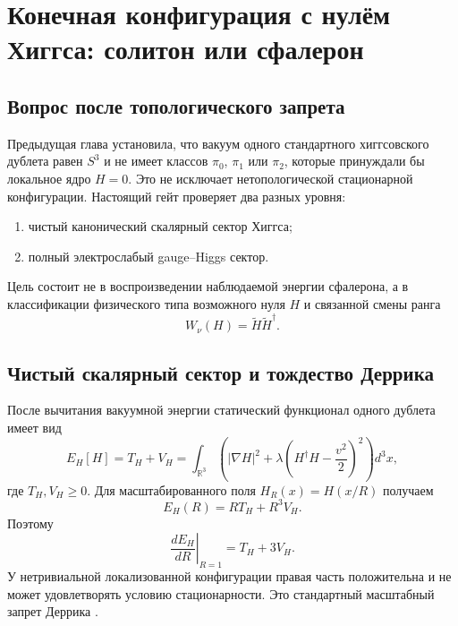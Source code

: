 \chapter{Конечная конфигурация с нулём Хиггса: солитон или сфалерон}
\label{ch:v6-spectral-transition-higgs-zero-finite-energy-saddle-gate}

\section{Вопрос после топологического запрета}

Предыдущая глава установила, что вакуум одного стандартного хиггсовского
дублета равен $S^3$ и не имеет классов $\pi_0$, $\pi_1$ или $\pi_2$,
которые принуждали бы локальное ядро $H=0$. Это не исключает
нетопологической стационарной конфигурации. Настоящий гейт проверяет два
разных уровня:
\begin{enumerate}
 \item чистый канонический скалярный сектор Хиггса;
 \item полный электрослабый gauge--Higgs сектор.
\end{enumerate}

Цель состоит не в воспроизведении наблюдаемой энергии сфалерона, а в
классификации физического типа возможного нуля $H$ и связанной смены ранга
\begin{equation}
 W_\nu(H)=\widetilde H\widetilde H^\dagger.
\end{equation}

\section{Чистый скалярный сектор и тождество Деррика}

После вычитания вакуумной энергии статический функционал одного дублета
имеет вид
\begin{equation}
 E_H[H]=T_H+V_H
 =\int_{\mathbb R^3}\left(
 |\nabla H|^2+
 \lambda\left(H^\dagger H-\frac{v^2}{2}\right)^2
 \right)d^3x,
 \label{eq:v6-higgs-scalar-energy}
\end{equation}
где $T_H,V_H\geq0$. Для масштабированного поля
$H_R(x)=H(x/R)$ получаем
\begin{equation}
 E_H(R)=R T_H+R^3V_H.
 \label{eq:v6-higgs-derrick-scaling}
\end{equation}
Поэтому
\begin{equation}
 \left.\frac{dE_H}{dR}\right|_{R=1}=T_H+3V_H.
\end{equation}
У нетривиальной локализованной конфигурации правая часть положительна и
не может удовлетворять условию стационарности. Это стандартный
масштабный запрет Деррика \cite{higgs-saddle-derrick1964}.

